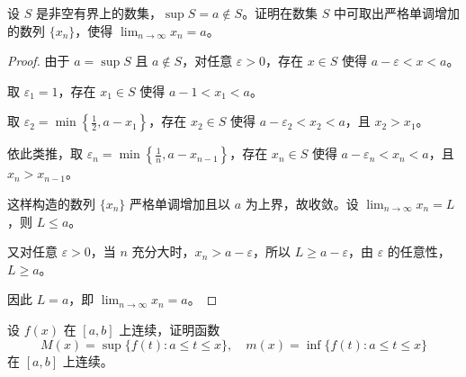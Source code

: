 \documentclass[lang=cn,12pt]{elegantbook}
\begin{document}
\begin{example}
设 $S$ 是非空有界上的数集，$\sup S = a \notin S$。证明在数集 $S$ 中可取出严格单调增加的数列 $\{x_n\}$，使得 $\lim_{n \to \infty} x_n = a$。
\end{example}

\begin{proof}
由于 $a = \sup S$ 且 $a \notin S$，对任意 $\varepsilon > 0$，存在 $x \in S$ 使得 $a - \varepsilon < x < a$。

取 $\varepsilon_1 = 1$，存在 $x_1 \in S$ 使得 $a - 1 < x_1 < a$。

取 $\varepsilon_2 = \min\left\{\frac{1}{2}, a - x_1\right\}$，存在 $x_2 \in S$ 使得 $a - \varepsilon_2 < x_2 < a$，且 $x_2 > x_1$。

依此类推，取 $\varepsilon_n = \min\left\{\frac{1}{n}, a - x_{n-1}\right\}$，存在 $x_n \in S$ 使得 $a - \varepsilon_n < x_n < a$，且 $x_n > x_{n-1}$。

这样构造的数列 $\{x_n\}$ 严格单调增加且以 $a$ 为上界，故收敛。设 $\lim_{n \to \infty} x_n = L$，则 $L \leq a$。

又对任意 $\varepsilon > 0$，当 $n$ 充分大时，$x_n > a - \varepsilon$，所以 $L \geq a - \varepsilon$，由 $\varepsilon$ 的任意性，$L \geq a$。

因此 $L = a$，即 $\lim_{n \to \infty} x_n = a$。
\end{proof}

\begin{example}
设 $f(x)$ 在 $[a,b]$ 上连续，证明函数 
\[
M(x) = \sup \{f(t): a \leq t \leq x\}, \quad m(x) = \inf \{f(t): a \leq t \leq x\}
\]
在 $[a,b]$ 上连续。
\end{example}
\end{document}
